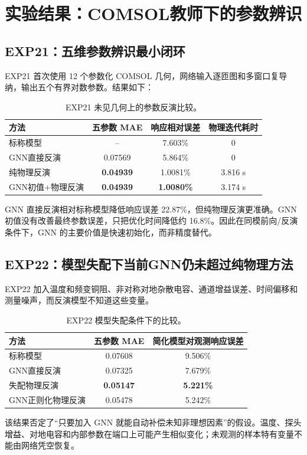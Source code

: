 \documentclass[UTF8,11pt,a4paper]{ctexart}
\begin{document}
\section{实验结果：COMSOL教师下的参数辨识}

\subsection{EXP21：五维参数辨识最小闭环}
EXP21 首次使用 12 个参数化 COMSOL 几何，网络输入逐匝图和多窗口复导纳，输出五个有界对数参数。结果如下：
\begin{table}[H]
\centering
\caption{EXP21 未见几何上的参数反演比较。}
\begin{tabular}{lccc}
\toprule
方法 & 五参数 MAE & 响应相对误差 & 物理迭代耗时\\
\midrule
标称模型 & -- & 7.603\% & 0\\
GNN直接反演 & 0.07569 & 5.864\% & 0\\
纯物理反演 & \textbf{0.04939} & 1.0081\% & 3.816 s\\
GNN初值+物理反演 & \textbf{0.04939} & \textbf{1.0080\%} & 3.174 s\\
\bottomrule
\end{tabular}
\end{table}
GNN 直接反演相对标称模型降低响应误差 22.87\%，但纯物理反演更准确。GNN 初值没有改善最终参数误差，只把优化时间降低约 16.8\%。因此在同模前向/反演条件下，GNN 的主要价值是快速初始化，而非精度替代。

\subsection{EXP22：模型失配下当前GNN仍未超过纯物理方法}
EXP22 加入温度和频变铜阻、非对称对地杂散电容、通道增益误差、时间偏移和测量噪声，而反演模型不知道这些变量。
\begin{table}[H]
\centering
\caption{EXP22 模型失配条件下的比较。}
\begin{tabular}{lcc}
\toprule
方法 & 五参数 MAE & 简化模型对观测响应误差\\
\midrule
标称模型 & 0.07608 & 9.506\%\\
GNN直接反演 & 0.07325 & 7.679\%\\
失配物理反演 & \textbf{0.05147} & \textbf{5.221\%}\\
GNN正则化物理反演 & 0.05478 & 5.242\%\\
\bottomrule
\end{tabular}
\end{table}
该结果否定了“只要加入 GNN 就能自动补偿未知非理想因素”的假设。温度、探头增益、对地电容和内部参数在端口上可能产生相似变化；未观测的样本特有变量不能由网络凭空恢复。
\end{document}
